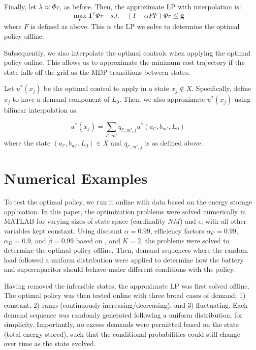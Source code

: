 \documentclass[conference]{IEEEtran}
\begin{document}
Finally, let $\lambda\approx \Phi r$, as before. Then, the approximate LP with interpolation is:
\begin{equation}
    \max_{\boldsymbol{r}} \boldsymbol{1}^{T} \Phi r
    \hspace{1em}s.t.\hspace{1em}
    (I-\alpha PF)\Phi r \leq \boldsymbol{g}
\end{equation}
where $F$ is defined as above. This is the LP we solve to determine the optimal policy offline.

Subsequently, we also interpolate the optimal controls when applying the optimal policy online. This allows us to approximate the minimum cost trajectory if the state falls off the grid as the MDP transitions between states. 

Let $u^{*}(x_{j})$ be the optimal control to apply in a state $x_{j} \notin X$. Specifically, define $x_{j}$ to have a demand component of $L_{0}$. Then, we also approximate $u^{*}(x_{j})$ using bilinear interpolation as:

\begin{equation}
    u^{*}(x_{j})=\sum_{l',m'}q_{l',m',j}u^{*}(a_{l'},b_{m'},L_{0})
\end{equation} where the state $(a_{l'},b_{m'},L_{0})\in X$ and $q_{l',m',j}$ is as defined above.
    
    
    

\section{Numerical Examples}
To test the optimal policy, we run it online with data based on the energy storage application. In this paper, the optimization problems were solved numerically in MATLAB for varying sizes of state space (cardinality $NM$) and $\epsilon$, with all other variables kept constant. Using discount $\alpha=0.99$, efficiency factors $\alpha_{C}=0.99$, $\alpha_{D}=0.9$, and $\beta=0.99$ based on \cite{su2013modeling}, and $K=2$, the problems were solved to determine the optimal policy offline. Then, demand sequences where the random load followed a uniform distribution were applied to determine how the battery and supercapacitor should behave under different conditions with the policy.

Having removed the infeasible states, the approximate LP was first solved offline. The optimal policy was then tested online with three broad cases of demand: 1) constant, 2) ramp (continuously increasing/decreasing), and 3) fluctuating. Each demand sequence was randomly generated following a uniform distribution, for simplicity. Importantly, no excess demands were permitted based on the state (total energy stored), such that the conditional probabilities could still change over time as the state evolved.
\end{document}
